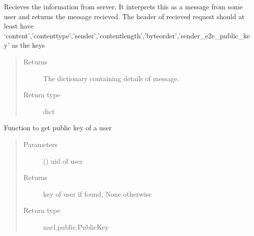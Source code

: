 \documentclass[letterpaper,10pt,english]{sphinxmanual}
\begin{document}
\begin{fulllineitems}
\begin{fulllineitems}
\end{fulllineitems}


\begin{fulllineitems}
\label{\detokenize{Message:Message.Message._recvmsg}}
Recieves the information from server. It interprets this as a message from some user and returns the message recieved. The header of recieved request should at least have ‘content’,’content\sphinxhyphen{}type’,’sender’,’content\sphinxhyphen{}length’,’byteorder’,’sender\_e2e\_public\_key’ as the keys
\begin{quote}\begin{description}
\item[{Returns}] \leavevmode
The dictionary containing details of message.

\item[{Return type}] \leavevmode
dict

\end{description}\end{quote}

\end{fulllineitems}


\begin{fulllineitems}
\label{\detokenize{Message:Message.Message._get_user_public_key}}
Function to get public key of a user
\begin{quote}\begin{description}
\item[{Parameters}] \leavevmode
{} () \textendash{} uid of user

\item[{Returns}] \leavevmode
key of user if found, None otherwise

\item[{Return type}] \leavevmode
nacl.public.PublicKey

\end{description}\end{quote}


\end{fulllineitems}
\end{fulllineitems}
\end{document}
